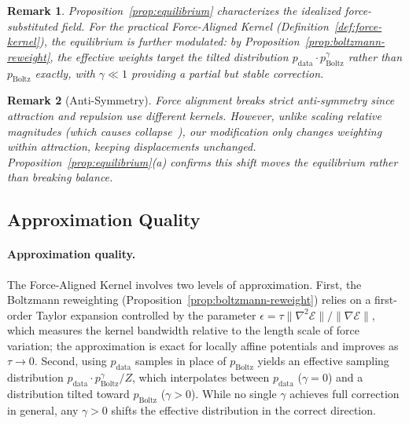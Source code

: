 \documentclass[11pt]{article}
\newtheorem{remark}{Remark}[section]
\newcommand{\pboltz}{p_{\text{Boltz}}}
\newcommand{\pdata}{p_{\text{data}}}
\begin{document}
\begin{remark}
\label{rem:approx-equilibrium}
Proposition~\ref{prop:equilibrium} characterizes the \emph{idealized} force-substituted field.
For the practical Force-Aligned Kernel (Definition~\ref{def:force-kernel}), the equilibrium is further modulated: by Proposition~\ref{prop:boltzmann-reweight}, the effective weights target the tilted distribution $\pdata \cdot \pboltz^\gamma$ rather than $\pboltz$ exactly, with $\gamma \ll 1$ providing a partial but stable correction.
\end{remark}

\begin{remark}[Anti-Symmetry]
\label{rem:antisymmetry}
Force alignment breaks strict anti-symmetry since attraction and repulsion use different kernels.
However, unlike scaling relative magnitudes (which causes collapse~\citep{deng2026drifting}), our modification only changes weighting within attraction, keeping displacements unchanged.
Proposition~\ref{prop:equilibrium}(a) confirms this shift moves the equilibrium rather than breaking balance.
\end{remark}
\subsection{Approximation Quality}
\label{sec:approximation}

\paragraph{Approximation quality.}
The Force-Aligned Kernel involves two levels of approximation.
First, the Boltzmann reweighting (Proposition~\ref{prop:boltzmann-reweight}) relies on a first-order Taylor expansion controlled by the parameter $\epsilon = \tau\|\nabla^2\mathcal{E}\|/\|\nabla\mathcal{E}\|$, which measures the kernel bandwidth relative to the length scale of force variation; the approximation is exact for locally affine potentials and improves as $\tau \to 0$.
Second, using $\pdata$ samples in place of $\pboltz$ yields an effective sampling distribution $\pdata \cdot \pboltz^\gamma / Z$, which interpolates between $\pdata$ ($\gamma = 0$) and a distribution tilted toward $\pboltz$ ($\gamma > 0$).
While no single $\gamma$ achieves full correction in general, any $\gamma > 0$ shifts the effective distribution in the correct direction.

\end{document}
